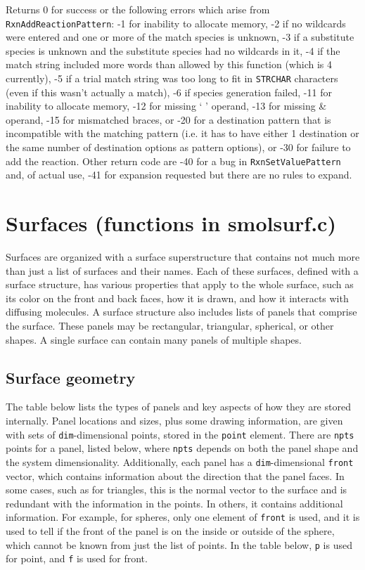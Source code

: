 \documentclass {scrbook}
\newcommand {\ttt} {\texttt}
\begin{document}
\begin{description}
Returns 0 for success or the following errors which arise from \ttt{RxnAddReactionPattern}: -1 for inability to allocate memory, -2 if no wildcards were entered and one or more of the match species is unknown, -3 if a substitute species is unknown and the substitute species had no wildcards in it, -4 if the match string included more words than allowed by this function (which is 4 currently), -5 if a trial match string was too long to fit in \ttt{STRCHAR} characters (even if this wasn't actually a match), -6 if species generation failed, -11 for inability to allocate memory, -12 for missing ` ' operand, -13 for missing \& operand, -15 for mismatched braces, or -20 for a destination pattern that is incompatible with the matching pattern (i.e. it has to have either 1 destination or the same number of destination options as pattern options), or -30 for failure to add the reaction. Other return code are -40 for a bug in \ttt{RxnSetValuePattern} and, of actual use, -41 for expansion requested but there are no rules to expand.


\end{description}


\section{Surfaces (functions in smolsurf.c)}

Surfaces are organized with a surface superstructure that contains not much more than just a list of surfaces and their names. Each of these surfaces, defined with a surface structure, has various properties that apply to the whole surface, such as its color on the front and back faces, how it is drawn, and how it interacts with diffusing molecules. A surface structure also includes lists of panels that comprise the surface. These panels may be rectangular, triangular, spherical, or other shapes. A single surface can contain many panels of multiple shapes.

\subsection{Surface geometry}

The table below lists the types of panels and key aspects of how they are stored internally. Panel locations and sizes, plus some drawing information, are given with sets of \ttt{dim}-dimensional points, stored in the \ttt{point} element. There are \ttt{npts} points for a panel, listed below, where \ttt{npts} depends on both the panel shape and the system dimensionality. Additionally, each panel has a \ttt{dim}-dimensional \ttt{front} vector, which contains information about the direction that the panel faces. In some cases, such as for triangles, this is the normal vector to the surface and is redundant with the information in the points. In others, it contains additional information. For example, for spheres, only one element of \ttt{front} is used, and it is used to tell if the front of the panel is on the inside or outside of the sphere, which cannot be known from just the list of points. In the table below, \ttt{p} is used for point, and \ttt{f} is used for front.
\end{document}

